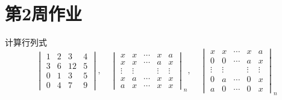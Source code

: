 \section{第2周作业}
\begin{example}{计算行列式}{}
\[\begin{vmatrix}
    1&2&3&4\\
    3&6&12&5\\
    0&1&3&5\\
    0&4&7&9
\end{vmatrix},\quad
\begin{vmatrix}x&x&\cdots&x&a\\x&x&\cdots&a&x\\\vdots&\vdots&&\vdots&\vdots\\x&a&\cdots&x&x\\a&x&\cdots&x&x\end{vmatrix}_n,\quad
\begin{vmatrix}x&x&\cdots&x&a\\0&0&\cdots&a&x\\\vdots&\vdots&&\vdots&\vdots\\0&a&\cdots&0&x\\a&0&\cdots&0&x\end{vmatrix}_n\]
\end{example}
